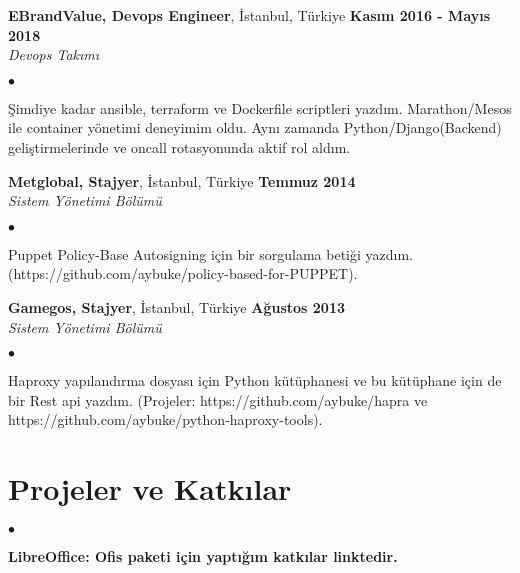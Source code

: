 \documentclass[margin,line]{res}
\newenvironment{list2}{
  \begin{list}{$\bullet$}{%
      \setlength{\itemsep}{0in}
      \setlength{\parsep}{0in} \setlength{\parskip}{0in}
      \setlength{\topsep}{0in} \setlength{\partopsep}{0in}
      \setlength{\leftmargin}{0.1in}}}{\end{list}}
\begin{document}
\begin{resume}
{\bf EBrandValue, Devops Engineer}, \.{I}stanbul, T\"{u}rkiye \hfill {\bf Kas{\i}m 2016 - May{\i}s 2018}\\

\vspace{-.7cm}
{\em Devops Tak{\i}m{\i} }
\vspace*{+.05in}
\begin{list2}
\item \c{S}imdiye kadar ansible, terraform ve Dockerfile scriptleri yazd{\i}m. Marathon/Mesos ile container y\"{o}netimi deneyimim oldu. Ayn{\i} zamanda Python/Django(Backend) geli\c{s}tirmelerinde ve oncall rotasyonunda aktif rol ald{\i}m.

\end{list2}

{\bf Metglobal, Stajyer}, \.{I}stanbul, T\"{u}rkiye \hfill {\bf Temmuz 2014}\\

\vspace{-.7cm}
{\em Sistem Y\"{o}netimi B\"{o}l\"{u}m\"{u} }
\vspace*{+.05in}
\begin{list2}
\item Puppet Policy-Base Autosigning i\c{c}in bir sorgulama beti\u{g}i yazd{\i}m. (https://github.com/aybuke/policy-based-for-PUPPET).
\end{list2}

{\bf Gamegos, Stajyer}, \.{I}stanbul, T\"{u}rkiye \hfill {\bf A\u{g}ustos 2013}\\

\vspace{-.7cm}
{\em Sistem Y\"{o}netimi B\"{o}l\"{u}m\"{u} }
\vspace*{+.05in}
\begin{list2}
\item Haproxy yap{\i}land{\i}rma dosyas{\i} i\c{c}in Python k\"{u}t\"{u}phanesi ve bu k\"{u}t\"{u}phane i\c{c}in de bir Rest api yazd{\i}m. (Projeler: https://github.com/aybuke/hapra ve https://github.com/aybuke/python-haproxy-tools).
\end{list2}

\section{\sc Projeler ve Katk{\i}lar}
\begin{list2}
\item {\bf LibreOffice: Ofis paketi i\c{c}in yapt{\i}\u{g}{\i}m katk{\i}lar linktedir.}


\end{list2}
\end{resume}
\end{document}
